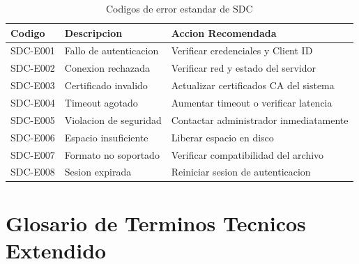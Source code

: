 \begin{table}[H]
\centering
\begin{tabular}{p{3cm}p{4cm}p{6cm}}
\toprule
\textbf{Codigo} & \textbf{Descripcion} & \textbf{Accion Recomendada} \\
\midrule
SDC-E001 & Fallo de autenticacion & Verificar credenciales y Client ID \\
\midrule
SDC-E002 & Conexion rechazada & Verificar red y estado del servidor \\
\midrule
SDC-E003 & Certificado invalido & Actualizar certificados CA del sistema \\
\midrule
SDC-E004 & Timeout agotado & Aumentar timeout o verificar latencia \\
\midrule
SDC-E005 & Violacion de seguridad & Contactar administrador inmediatamente \\
\midrule
SDC-E006 & Espacio insuficiente & Liberar espacio en disco \\
\midrule
SDC-E007 & Formato no soportado & Verificar compatibilidad del archivo \\
\midrule
SDC-E008 & Sesion expirada & Reiniciar sesion de autenticacion \\
\bottomrule
\end{tabular}
\caption{Codigos de error estandar de SDC}
\label{tab:errores}
\end{table}

\section{Glosario de Terminos Tecnicos Extendido}
\label{sec:glosario-tecnico}

